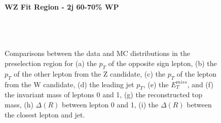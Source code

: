 \begin{figure}[H] 
    \centering
    \textbf{WZ Fit Region - 2j 60-70\% WP}\\
    \\
    \\
    \\
    \caption{Comparisons between the data and MC distributions in the preselection region for (a) the $p_T$ of the opposite sign lepton, (b) the $p_T$ of the other lepton from the Z candidate, (c) the $p_T$ of the lepton from the W candidate, (d) the leading jet $p_T$, (e) the $E_T^{miss}$, and (f) the invariant mass of leptons 0 and 1, (g) the reconstructed top mass, (h) $\Delta(R)$ between lepton 0 and 1, (i) the $\Delta(R)$ between the closest lepton and jet.}
    \label{kin:WP_2j_60_70}
\end{figure}

